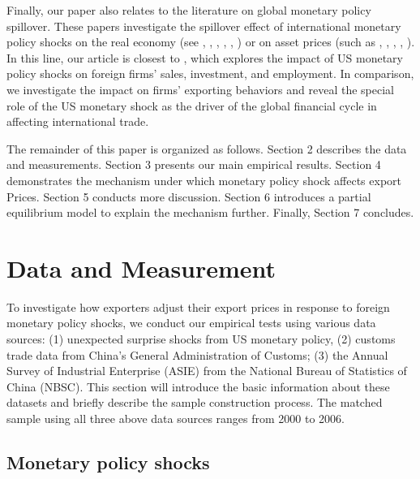 Finally, our paper also relates to the literature on global monetary policy spillover. These papers investigate the spillover effect of international monetary policy shocks on the real economy (see \cite{kim2001international}, \cite{faust2003monetary}, \cite{faust2003identifying}, \cite{mackowiak2007external}, \cite{di2008impact}, \cite{bluedorn2011open}) or on asset prices (such as \cite{craine2008international}, \cite{wongswan2009response}, \cite{hausman2011global}, \cite{rogers2014evaluating}, \cite{miranda2020us}). In this line, our article is closest to \cite{di2023impact}, which explores the impact of US monetary policy shocks on foreign firms’ sales, investment, and employment. In comparison, we investigate the impact on firms' exporting behaviors and reveal the special role of the US monetary shock as the driver of the global financial cycle in affecting international trade.

The remainder of this paper is organized as follows. Section 2 describes the data and measurements. Section 3 presents our main empirical results. Section 4 demonstrates the mechanism under which monetary policy shock affects export Prices. Section 5 conducts more discussion. Section 6 introduces a partial equilibrium model to explain the mechanism further. Finally, Section 7 concludes.


\newpage
\section{Data and Measurement}

To investigate how exporters adjust their export prices in response to foreign monetary policy shocks, we conduct our empirical tests using various data sources: (1) unexpected surprise shocks from US monetary policy, (2) customs trade data from China’s General Administration of Customs; (3) the Annual Survey of Industrial Enterprise (ASIE) from the National Bureau of Statistics of China (NBSC). This section will introduce the basic information about these datasets and briefly describe the sample construction process. The matched sample using all three above data sources ranges from 2000 to 2006.

\subsection{Monetary policy shocks}

